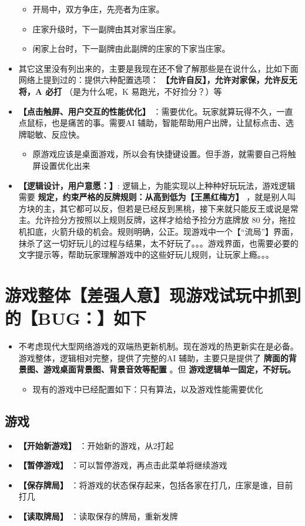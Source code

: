 \documentclass[9pt, b5paper]{article}
\begin{document}
\begin{itemize}
\begin{itemize}
\item 开局中，双方争庄，先亮者为庄家。
\item 庄家升级时，下一副牌由其对家当庄家。
\item 闲家上台时，下一副牌由此副牌的庄家的下家当庄家。
\end{itemize}
\item 其它这里没有列出来的，主要是我现在还不曾了解那些是在说什么，比如下面网络上提到过的：提供六种配置选项： \textbf{【允许自反】，允许对家保，允许反无将，A 必打} （是为什么呢，K 易跑光，不好捡分？）等
\item \textbf{【点击触屏、用户交互的性能优化】} ：需要优化。玩家就算玩得不久，一直点鼠标，也是痛苦的事。需要AI 辅助，智能帮助用户出牌，让鼠标点击、选牌聪敏、反应快。
\begin{itemize}
\item 原游戏应该是桌面游戏，所以会有快捷键设置。但手游，就需要自己将触屏设置优化出来
\end{itemize}
\item \textbf{【逻辑设计，用户意愿：】}: 逻辑上，为能实现以上种种好玩玩法，游戏逻辑需要 \textbf{规定，约束严格的反牌规则：从高到低为【王黑红梅方】} ，就是别人叫方块的主，其它都可以反，但若是已经反到黑桃，接下来就只能反王或说是常主。允许捡分方按照以上规则反牌，这样才给给予捡分方底牌放 80 分，拖拉机扣底，火箭升级的机会。规则明确，公正。现游戏中一个【“流局”】界面，抹杀了这一切好玩儿的过程与结果，太不好玩了。。。游戏界面，也需要必要的文字提示等，帮助玩家理解游戏中的这些好玩儿规则，让玩家上瘾。。。
\end{itemize}
\section{游戏整体【差强人意】现游戏试玩中抓到的【BUG：】如下}
\label{sec-3}
\begin{itemize}
\item 不考虑现代大型网络游戏的双端热更新机制。现在游戏的热更新实在是必备。游戏整体，逻辑相对完整，提供了完整的AI 辅助，主要只是提供了 \textbf{牌面的背景图、游戏桌面背景图、背景音效等配置} 。但 \textbf{游戏逻辑单一固定，不好玩。}
\begin{itemize}
\item 现有的游戏中已经配置如下：只有算法，以及游戏性能需要优化
\end{itemize}
\end{itemize}
\subsection{游戏}
\label{sec-3-1}
\begin{itemize}
\item \textbf{【开始新游戏】} ：开始新的游戏，从2打起
\item \textbf{【暂停游戏】} ：可以暂停游戏，再点击此菜单将继续游戏
\item \textbf{【保存牌局】} ：将游戏的状态保存起来，包括各家在打几，庄家是谁，目前打几
\item \textbf{【读取牌局】} ：读取保存的牌局，重新发牌
\end{itemize}
\end{document}
